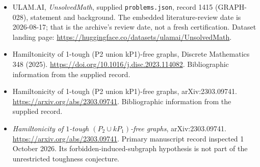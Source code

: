 \documentclass[11pt,a4paper]{article}
\begin{document}
{\small

\begin{itemize}

\item[\hypertarget{source:1415:1}{S1}] ULAM.AI, \emph{UnsolvedMath}, supplied \texttt{problems.json}, record 1415 (GRAPH-028), statement and background. The embedded literature-review date is 2026-08-17; that is the archive’s review date, not a fresh certification. Dataset landing page: \url{https://huggingface.co/datasets/ulamai/UnsolvedMath}.

\item[\hypertarget{source:1415:2}{S2}] Hamiltonicity of 1-tough (P2 union kP1)-free graphs, Discrete Mathematics 348 (2025). \url{https://doi.org/10.1016/j.disc.2023.114082}. Bibliographic information from the supplied record.

\item[\hypertarget{source:1415:3}{S3}] Hamiltonicity of 1-tough (P2 union kP1)-free graphs, arXiv:2303.09741. \url{https://arxiv.org/abs/2303.09741}. Bibliographic information from the supplied record.


\item[E1] \emph{Hamiltonicity of $1$-tough
$(P_2\cup kP_1)$-free graphs}, arXiv:2303.09741.
\url{https://arxiv.org/abs/2303.09741}. Primary manuscript record
inspected 1 October 2026. Its forbidden-induced-subgraph hypothesis
is not part of the unrestricted toughness conjecture.

\end{itemize}

}

\label{end:1415}
\end{document}
